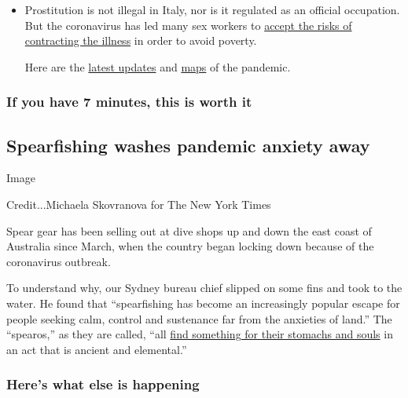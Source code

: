 \begin{itemize}
\item
  Prostitution is not illegal in Italy, nor is it regulated as an
  official occupation. But the coronavirus has led many sex workers to
  \href{https://www.nytimes3xbfgragh.onion/2020/08/03/world/europe/italy-coronavirus-prostitution-sex-work.html}{accept
  the risks of contracting the illness} in order to avoid poverty.

  Here are the
  \href{https://www.nytimes3xbfgragh.onion/2020/08/03/world/coronavirus-covid-19.html?action=click\&pgtype=Article\&state=default\&module=styln-coronavirus\&region=TOP_BANNER\&context=storylines_menu}{latest
  updates} and
  \href{https://www.nytimes3xbfgragh.onion/interactive/2020/world/coronavirus-maps.html}{maps}
  of the pandemic.
\end{itemize}

\hypertarget{if-you-have-7-minutes-this-is-worth-it}{%
\subsubsection{If you have 7 minutes, this is worth
it}\label{if-you-have-7-minutes-this-is-worth-it}}

\hypertarget{spearfishing-washes-pandemic-anxiety-away}{%
\subsection{Spearfishing washes pandemic anxiety
away}\label{spearfishing-washes-pandemic-anxiety-away}}

Image

Credit...Michaela Skovranova for The New York Times

Spear gear has been selling out at dive shops up and down the east coast
of Australia since March, when the country began locking down because of
the coronavirus outbreak.

To understand why, our Sydney bureau chief slipped on some fins and took
to the water. He found that ``spearfishing has become an increasingly
popular escape for people seeking calm, control and sustenance far from
the anxieties of land.'' The ``spearos,'' as they are called, ``all
\href{https://www.nytimes3xbfgragh.onion/2020/08/03/world/australia/spearfishing-sydney-coronavirus.html}{find
something for their stomachs and souls} in an act that is ancient and
elemental.''

\hypertarget{heres-what-else-is-happening}{%
\subsubsection{Here's what else is
happening}\label{heres-what-else-is-happening}}

